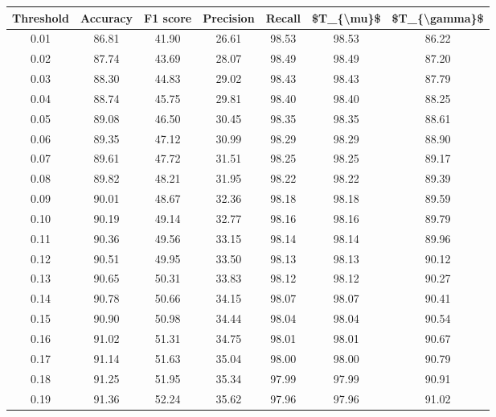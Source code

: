 \begin{tabular}{|c|c|c|c|c|c|c|}
\hline
 Threshold &  Accuracy &  F1 score &  Precision &  Recall &  \$T\_\{\textbackslash mu\}\$ &  \$T\_\{\textbackslash gamma\}\$ \\
\hline
      0.01 &     86.81 &     41.90 &      26.61 &   98.53 &      98.53 &         86.22 \\
      0.02 &     87.74 &     43.69 &      28.07 &   98.49 &      98.49 &         87.20 \\
      0.03 &     88.30 &     44.83 &      29.02 &   98.43 &      98.43 &         87.79 \\
      0.04 &     88.74 &     45.75 &      29.81 &   98.40 &      98.40 &         88.25 \\
      0.05 &     89.08 &     46.50 &      30.45 &   98.35 &      98.35 &         88.61 \\
      0.06 &     89.35 &     47.12 &      30.99 &   98.29 &      98.29 &         88.90 \\
      0.07 &     89.61 &     47.72 &      31.51 &   98.25 &      98.25 &         89.17 \\
      0.08 &     89.82 &     48.21 &      31.95 &   98.22 &      98.22 &         89.39 \\
      0.09 &     90.01 &     48.67 &      32.36 &   98.18 &      98.18 &         89.59 \\
      0.10 &     90.19 &     49.14 &      32.77 &   98.16 &      98.16 &         89.79 \\
      0.11 &     90.36 &     49.56 &      33.15 &   98.14 &      98.14 &         89.96 \\
      0.12 &     90.51 &     49.95 &      33.50 &   98.13 &      98.13 &         90.12 \\
      0.13 &     90.65 &     50.31 &      33.83 &   98.12 &      98.12 &         90.27 \\
      0.14 &     90.78 &     50.66 &      34.15 &   98.07 &      98.07 &         90.41 \\
      0.15 &     90.90 &     50.98 &      34.44 &   98.04 &      98.04 &         90.54 \\
      0.16 &     91.02 &     51.31 &      34.75 &   98.01 &      98.01 &         90.67 \\
      0.17 &     91.14 &     51.63 &      35.04 &   98.00 &      98.00 &         90.79 \\
      0.18 &     91.25 &     51.95 &      35.34 &   97.99 &      97.99 &         90.91 \\
      0.19 &     91.36 &     52.24 &      35.62 &   97.96 &      97.96 &         91.02 \\

\end{tabular}
